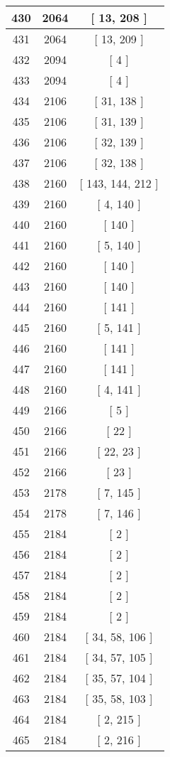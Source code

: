 \begin{center}
\begin{longtable}[H]{|| c c c ||}
\hline
430 & 2064 & [ 13, 208 ] \\ 
\hline
431 & 2064 & [ 13, 209 ] \\ 
\hline
432 & 2094 & [ 4 ] \\ 
\hline
433 & 2094 & [ 4 ] \\ 
\hline
434 & 2106 & [ 31, 138 ] \\ 
\hline
435 & 2106 & [ 31, 139 ] \\ 
\hline
436 & 2106 & [ 32, 139 ] \\ 
\hline
437 & 2106 & [ 32, 138 ] \\ 
\hline
438 & 2160 & [ 143, 144, 212 ] \\ 
\hline
439 & 2160 & [ 4, 140 ] \\ 
\hline
440 & 2160 & [ 140 ] \\ 
\hline
441 & 2160 & [ 5, 140 ] \\ 
\hline
442 & 2160 & [ 140 ] \\ 
\hline
443 & 2160 & [ 140 ] \\ 
\hline
444 & 2160 & [ 141 ] \\ 
\hline
445 & 2160 & [ 5, 141 ] \\ 
\hline
446 & 2160 & [ 141 ] \\ 
\hline
447 & 2160 & [ 141 ] \\ 
\hline
448 & 2160 & [ 4, 141 ] \\ 
\hline
449 & 2166 & [ 5 ] \\ 
\hline
450 & 2166 & [ 22 ] \\ 
\hline
451 & 2166 & [ 22, 23 ] \\ 
\hline
452 & 2166 & [ 23 ] \\ 
\hline
453 & 2178 & [ 7, 145 ] \\ 
\hline
454 & 2178 & [ 7, 146 ] \\ 
\hline
455 & 2184 & [ 2 ] \\ 
\hline
456 & 2184 & [ 2 ] \\ 
\hline
457 & 2184 & [ 2 ] \\ 
\hline
458 & 2184 & [ 2 ] \\ 
\hline
459 & 2184 & [ 2 ] \\ 
\hline
460 & 2184 & [ 34, 58, 106 ] \\ 
\hline
461 & 2184 & [ 34, 57, 105 ] \\ 
\hline
462 & 2184 & [ 35, 57, 104 ] \\ 
\hline
463 & 2184 & [ 35, 58, 103 ] \\ 
\hline
464 & 2184 & [ 2, 215 ] \\ 
\hline
465 & 2184 & [ 2, 216 ] \\ 

\end{longtable}
\end{center}
